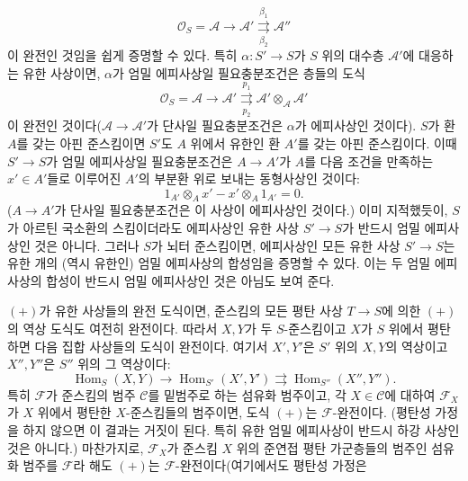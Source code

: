 \[
  \mathcal O_S=\mathcal A\longrightarrow\mathcal A'
  \overset{\beta_1}{\underset{\beta_2}{\rightrightarrows}}\mathcal A''
\]
이 완전인 것임을 쉽게 증명할 수 있다. 특히
$\alpha:S'\longrightarrow S$가 $S$ 위의 대수층 $\mathcal A'$에
대응하는 유한 사상이면, $\alpha$가 엄밀 에피사상일 필요충분조건은
층들의 도식
\[
  \mathcal O_S=\mathcal A\longrightarrow\mathcal A'
  \overset{p_1}{\underset{p_2}{\rightrightarrows}}
  \mathcal A'\otimes_{\mathcal A}\mathcal A'
\]
이 완전인 것이다($\mathcal A\longrightarrow\mathcal A'$가 단사일
필요충분조건은 $\alpha$가 에피사상인 것이다). $S$가 환 $A$를 갖는
아핀 준스킴이면 $S'$도 $A$ 위에서 유한인 환 $A'$를 갖는 아핀
준스킴이다. 이때 $S'\longrightarrow S$가 엄밀 에피사상일
필요충분조건은 $A\longrightarrow A'$가 $A$를 다음 조건을 만족하는
$x'\in A'$들로 이루어진 $A'$의 부분환 위로 보내는 동형사상인 것이다:
\[
  1_{A'}\otimes_Ax'-x'\otimes_A1_{A'}=0.
\]
($A\longrightarrow A'$가 단사일 필요충분조건은 이 사상이
에피사상인 것이다.) 이미 지적했듯이, $S$가 아르틴 국소환의
스킴이더라도 에피사상인 유한 사상 $S'\longrightarrow S$가 반드시
엄밀 에피사상인 것은 아니다. 그러나 $S$가 뇌터 준스킴이면,
에피사상인 모든 유한 사상 $S'\longrightarrow S$는 유한 개의
(역시 유한인) 엄밀 에피사상의 합성임을 증명할 수 있다. 이는 두
엄밀 에피사상의 합성이 반드시 엄밀 에피사상인 것은 아님도 보여 준다.

 $(+)$가 유한 사상들의 완전 도식이면, 준스킴의 모든 평탄
사상 $T\longrightarrow S$에 의한 $(+)$의 역상 도식도 여전히 완전이다.
따라서 $X,Y$가 두 $S$-준스킴이고 $X$가 $S$ 위에서 평탄하면 다음
집합 사상들의 도식이 완전이다. 여기서 $X',Y'$은 $S'$ 위의 $X,Y$의
역상이고 $X'',Y''$은 $S''$ 위의 그 역상이다:
\[
  \operatorname{Hom}_S(X,Y)\longrightarrow
  \operatorname{Hom}_{S'}(X',Y')
  \rightrightarrows
  \operatorname{Hom}_{S''}(X'',Y'').
\]
특히 $\mathcal F$가 준스킴의 범주 $\mathcal C$를 밑범주로 하는
섬유화 범주이고, 각 $X\in\mathcal C$에 대하여 $\mathcal F_X$가
$X$ 위에서 평탄한 $X$-준스킴들의 범주이면, 도식 $(+)$는
$\mathcal F$-완전이다. (평탄성 가정을 하지 않으면 이 결과는 거짓이
된다. 특히 유한 엄밀 에피사상이 반드시 하강 사상인 것은 아니다.)
마찬가지로, $\mathcal F_X$가 준스킴 $X$ 위의 준연접 평탄 가군층들의
범주인 섬유화 범주를 $\mathcal F$라 해도 $(+)$는
$\mathcal F$-완전이다(여기에서도 평탄성 가정은

